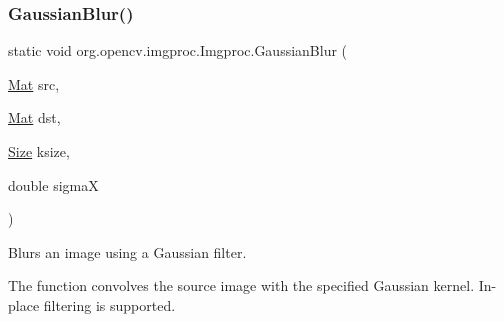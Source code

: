 \subsubsection{\texorpdfstring{Gaussian\+Blur()}{GaussianBlur()}\hspace{0.1cm}{\footnotesize\ttfamily [3/3]}}
{\footnotesize\ttfamily static void org.\+opencv.\+imgproc.\+Imgproc.\+Gaussian\+Blur (\begin{DoxyParamCaption}\item[{\mbox{\hyperlink{classorg_1_1opencv_1_1core_1_1_mat}{Mat}}}]{src,  }\item[{\mbox{\hyperlink{classorg_1_1opencv_1_1core_1_1_mat}{Mat}}}]{dst,  }\item[{\mbox{\hyperlink{classorg_1_1opencv_1_1core_1_1_size}{Size}}}]{ksize,  }\item[{double}]{sigmaX }\end{DoxyParamCaption})\hspace{0.3cm}{\ttfamily [static]}}

Blurs an image using a Gaussian filter.

The function convolves the source image with the specified Gaussian kernel. In-\/place filtering is supported.


